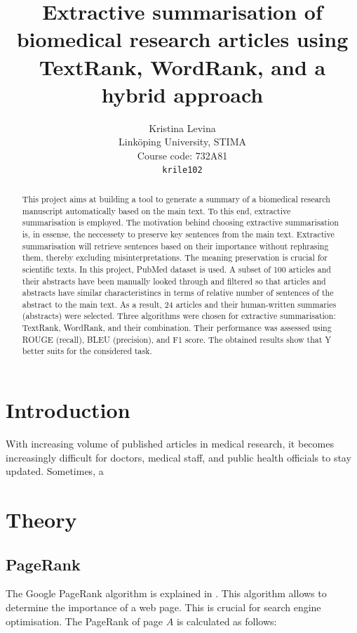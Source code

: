 \documentclass[11pt]{article}
\title{Extractive summarisation of biomedical research articles using TextRank, WordRank, and a hybrid approach}
\author{Kristina Levina \\
  Linköping University, STIMA \\
  Course code: 732A81 \\
 \texttt{krile102} \\}
\begin{document}
\maketitle
\begin{abstract}
This project aims at building a tool to generate a summary of a biomedical research manuscript automatically based on the main text. To this end, extractive summarisation is employed. The motivation behind choosing extractive summarisation is, in essense, the neccessety to preserve key sentences from the main text. Extractive summarisation will retrieve sentences based on their importance without rephrasing them, thereby excluding misinterpretations. The meaning preservation is crucial for scientific texts. In this project, PubMed dataset is used. A subset of 100 articles and their abstracts have been manually looked through and filtered so that articles and abstracts have similar characteristincs in terms of relative number of sentences of the abstract to the main text. As a result, 24 articles and their human-written summaries (abstracts) were selected. Three algorithms were chosen for extractive summarisation: TextRank, WordRank, and their combination. Their performance was assessed using ROUGE (recall), BLEU (precision), and F1 score. The obtained results show that Y better suits for the considered task. 

\end{abstract}

\section{Introduction}

With increasing volume of published articles in medical research, it becomes increasingly difficult for doctors, medical staff, and public health officials to stay updated. Sometimes, a

\section{Theory}
\subsection{PageRank}

The Google PageRank algorithm is explained in \citet{rogers2002google}. This algorithm allows to determine the importance of a web page. This is crucial for search engine optimisation. The PageRank of page $A$ is calculated as follows:
\end{document}

